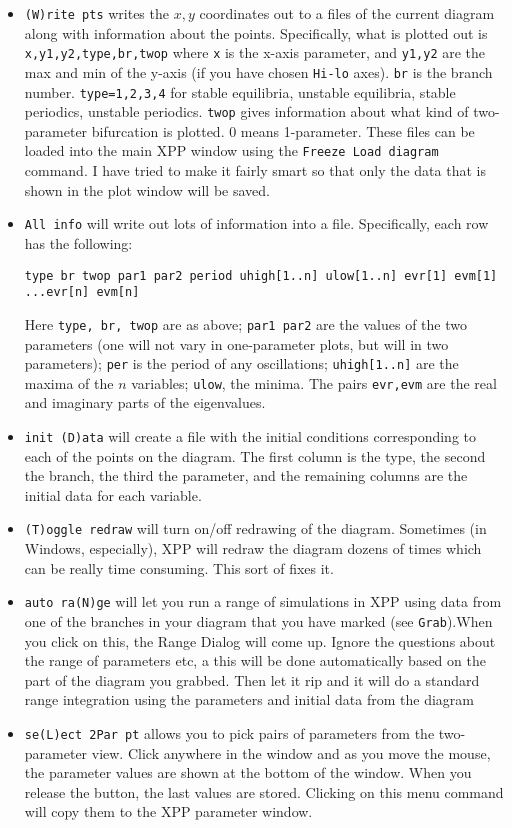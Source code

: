 \documentclass{article}
\begin{document}
\begin{itemize}
\begin{itemize}
\item {\tt (W)rite pts} writes the $x,y$ coordinates out to a files of the current diagram along with information about the points. Specifically, what is plotted out is {\tt x,y1,y2,type,br,twop} where {\tt x} is the x-axis parameter, and {\tt y1,y2} are the max and min of the y-axis (if you have chosen {\tt Hi-lo} axes). {\tt br} is the branch number. {\tt type=1,2,3,4} for stable equilibria, unstable equilibria, stable periodics, unstable periodics.  {\tt twop} gives information about what kind of two-parameter bifurcation is plotted. 0 means 1-parameter. These files can be loaded into the main XPP window using the {\tt Freeze Load diagram} command. I have tried to make it fairly smart so that only the data that is shown in the plot window will be saved.
\item {\tt All info} will write out lots of information into a file. Specifically, each row has the following:
\begin{verbatim}
type br twop par1 par2 period uhigh[1..n] ulow[1..n] evr[1] evm[1] ...evr[n] evm[n]
\end{verbatim} 
Here {\tt type, br, twop} are as above; {\tt par1 par2} are the values of the two parameters (one will not vary in one-parameter plots, but will in two parameters); {\tt per} is the period of any oscillations; {\tt uhigh[1..n]} are the maxima of the $n$ variables; {\tt ulow}, the minima. The pairs {\tt evr,evm} are the real and imaginary parts of the eigenvalues.
\item {\tt init (D)ata} will create a file with the initial conditions corresponding to each of the points on the diagram. The first column is the type, the second the branch, the third the parameter, and the remaining columns are the initial data for each variable.
\item {\tt (T)oggle redraw} will turn on/off redrawing of the diagram. Sometimes (in Windows, especially), XPP will redraw the diagram dozens of times which can be really time consuming. This sort of fixes it.
\item {\tt auto ra(N)ge} will let you run a range of simulations in XPP using data from one of the branches in your diagram that you have marked (see {\tt Grab}).When you click on this, the Range Dialog will come up. Ignore the questions about the range of parameters etc, a this will be done automatically based on the part of the diagram you grabbed. Then let it rip and it will do a standard range integration using the parameters and initial data from the diagram   
\item {\tt se(L)ect 2Par pt} allows you to pick pairs of parameters from the two-parameter view. Click anywhere in the window and as you move the mouse, the parameter values are shown at the bottom of the window. When you release the button, the last values are stored. Clicking on this menu command will copy them to the XPP parameter window.

\end{itemize}
\end{itemize}
\end{document}
